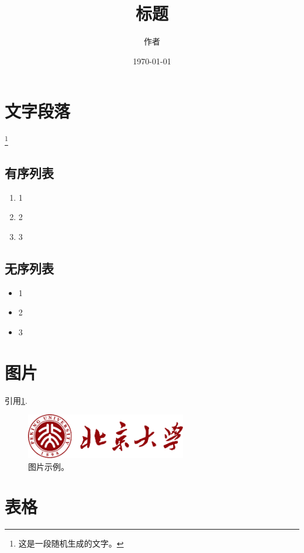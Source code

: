 \documentclass[12pt]{article}
\title{标题}
\author{作者}
\date{\today}
\begin{document}


\maketitle


\section{文字段落}


\lipsum[1]\footnote{这是一段随机生成的文字。}

\subsection{有序列表}

\begin{enumerate}
	\item 1
	\item 2
	\item 3
\end{enumerate}

\subsection{无序列表}

\begin{itemize}
	\item 1
	\item 2
	\item 3
\end{itemize}


\section{图片}

引用\cref{fig:1}.

\begin{figure}[htp]
	\centering
	\includegraphics[width=7cm]{pku.pdf}
	\caption{图片示例。}
	\label{fig:1}
\end{figure}

\section{表格}
\end{document}
